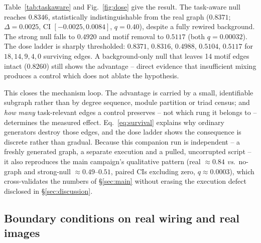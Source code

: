 \documentclass[10pt,twocolumn,letterpaper]{article}
\begin{document}
Table~\ref{tab:taskaware} and Fig.~\ref{fig:dose} give the result. The
task-aware null reaches $0.8346$, statistically indistinguishable from the
real graph ($0.8371$; $\Delta=0.0025$, CI $[-0.0025,0.0084]$, $q=0.40$),
despite a fully rewired background. The strong null falls to $0.4920$ and
motif removal to $0.5117$ (both $q=0.00032$). The dose ladder is sharply
thresholded: $0.8371$, $0.8316$, $0.4988$, $0.5104$, $0.5117$ for
$18,14,9,4,0$ surviving edges. A background-only null that leaves 14 motif
edges intact ($0.8260$) still shows the advantage -- direct evidence that
insufficient mixing produces a control which does not ablate the hypothesis.

This closes the mechanism loop. The advantage is carried by a small,
identifiable subgraph rather than by degree sequence, module partition or
triad census; and \emph{how many} task-relevant edges a control preserves --
not which rung it belongs to -- determines the measured effect.
Eq.~\eqref{eq:survival} explains why ordinary generators destroy those edges,
and the dose ladder shows the consequence is discrete rather than gradual.
Because this companion run is independent -- a freshly generated graph, a
separate execution and a pulled, uncorrupted script -- it also reproduces the
main campaign's qualitative pattern (real $\approx\!0.84$ \emph{vs}.\
no-graph and strong-null $\approx\!0.49$--$0.51$, paired CIs excluding zero,
$q\!\approx\!0.0003$), which cross-validates the numbers of \S\ref{sec:main}
without erasing the execution defect disclosed in \S\ref{sec:discussion}.

\subsection{Boundary conditions on real wiring and real images}
\label{sec:realconnectome}
\label{sec:density}
\label{sec:visualtask}
\end{document}
